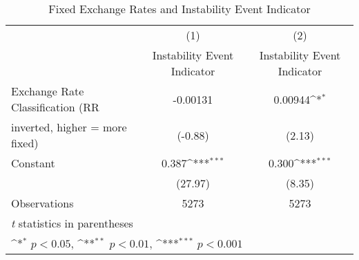 \begin{table}[htbp]\centering
\def\sym#1{\ifmmode^{#1}\else\(^{#1}\)\fi}
\caption{Fixed Exchange Rates and Instability Event Indicator \label{instabRRalone}}
\begin{tabular}{l*{2}{c}}
\toprule
                                        &\multicolumn{1}{c}{(1)}&\multicolumn{1}{c}{(2)}\\
                                        &\multicolumn{1}{c}{Instability Event Indicator}&\multicolumn{1}{c}{Instability Event Indicator}\\
\midrule
Exchange Rate Classification (RR        & -0.00131         &  0.00944\sym{*}  \\
inverted, higher = more fixed)          &  (-0.88)         &   (2.13)         \\
\addlinespace
Constant                                &    0.387\sym{***}&    0.300\sym{***}\\
                                        &  (27.97)         &   (8.35)         \\
\midrule
Observations                            &     5273         &     5273         \\
\bottomrule
\multicolumn{3}{l}{\footnotesize \textit{t} statistics in parentheses}\\
\multicolumn{3}{l}{\footnotesize \sym{*} \(p<0.05\), \sym{**} \(p<0.01\), \sym{***} \(p<0.001\)}\\
\end{tabular}
\end{table}
